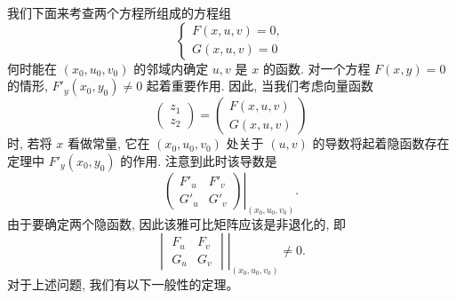\documentclass[12pt,fontset=fandol]{ctexart}
\begin{document}
我们下面来考查两个方程所组成的方程组
\[
  \begin{cases}
    F(x,u,v)=0,\\
    G(x,u,v)=0
  \end{cases}
\]
何时能在 $(x_0,u_0,v_0)$ 的邻域内确定 $u,v$ 是 $x$ 的函数. 对一个方程 $F(x,y)=0$ 的情形, $F'_y(x_0,y_0)\ne0$ 起着重要作用. 因此, 当我们考虑向量函数
\[
  \begin{pmatrix}
    z_1\\
    z_2
  \end{pmatrix}
  =
  \begin{pmatrix}
    F(x,u,v)\\
    G(x,u,v)
  \end{pmatrix}
\]
时, 若将 $x$ 看做常量, 它在 $(x_0,u_0,v_0)$ 处关于 $(u,v)$ 的导数将起着隐函数存在定理中 $F'_y(x_0,y_0)$ 的作用. 注意到此时该导数是
\[
  \left.
  \begin{pmatrix}
    F'_u & F'_v\\
    G'_u & G'_v
  \end{pmatrix}
  \right|_{(x_0,u_0,v_0)}.
\]
由于要确定两个隐函数, 因此该雅可比矩阵应该是非退化的, 即
\[
  \left.
  \begin{vmatrix}
    F_u & F_v\\
    G_u & G_v
  \end{vmatrix}
  \right|_{(x_0,u_0,v_0)}\ne0.
\]
对于上述问题, 我们有以下一般性的定理。
\end{document}
